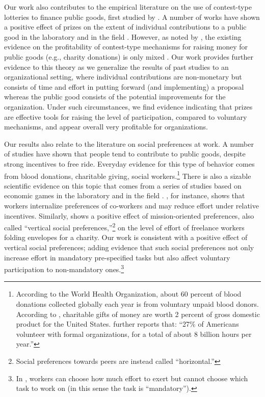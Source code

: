 \documentclass[11pt, titlepage]{article}
\begin{document}
Our work also contributes to the empirical literature on the use of
contest-type lotteries to finance public goods, first studied by
\citet{morgan2000financing}. A number of works have shown a positive
effect of prizes on the extent of individual contributions to a public
good in the laboratory
\citep{morgan2000funding, dale2004charitable, lange2007using} and in the
field \citep{landry2006toward}. However, as noted by
\citet{vesterlund2012voluntary}, the existing evidence on the
profitability of contest-type mechanisms for raising money for public
goods (e.g., charity donations) is only mixed
\citep{vesterlund2012voluntary}. Our work provides further evidence to
this theory as we generalize the results of past studies to an
organizational setting, where individual contributions are non-monetary
but consists of time and effort in putting forward (and implementing) a
proposal whereas the public good consists of the potential improvements
for the organization. Under such circumstances, we find evidence
indicating that prizes are effective tools for raising the level of
participation, compared to voluntary mechanisms, and appear overall very
profitable for organizations.

Our results also relate to the literature on social preferences at work.
A number of studies have shown that people tend to contribute to public
goods, despite strong incentives to free ride. Everyday evidence for
this type of behavior comes from blood donations, charitable giving,
social workers.\footnote{According to the World Health Organization,
  about 60 percent of blood donations collected globally each year is
  from voluntary unpaid blood donors. According to
  \citet{list2011market}, charitable gifts of money are worth 2 percent
  of gross domestic product for the United States.
  \citet{lacetera2014rewarding} further reports that: ``27\% of
  Americans volunteer with formal organizations, for a total of about 8
  billion hours per year.''} There is also a sizable scientific evidence
on this topic that comes from a series of studies based on economic
games in the laboratory \citep[see][ for a review]{levitt2007laboratory}
and in the field \citep{bandiera2005social, dellavigna2016estimating}.
\citet{bandiera2005social}, for instance, shows that workers internalize
preferences of co-workers and may reduce effort under relative
incentives. Similarly, \citet{dellavigna2016estimating} shows a positive
effect of mission-oriented preferences, also called ``vertical social
preferences,''\footnote{Social preferences towards peers are instead
  called ``horizontal.''} on the level of effort of freelance workers
folding envelopes for a charity. Our work is consistent with a positive
effect of vertical social preferences; adding evidence that such social
preferences not only increase effort in mandatory pre-specified tasks
but also affect voluntary participation to non-mandatory ones.\footnote{In
  \citet{dellavigna2016estimating}, workers can choose how much effort
  to exert but cannot choose which task to work on (in this sense the
  task is ``mandatory'').}
\end{document}
